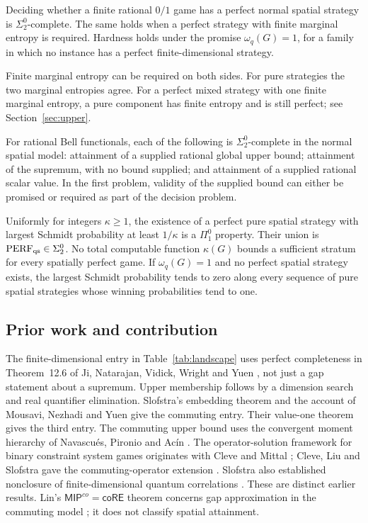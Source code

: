 \begin{theoremA}\label{thm:A}
Deciding whether a finite rational $0/1$ game has a perfect normal spatial strategy is $\Sigma^0_2$-complete. The same holds when a perfect strategy with finite marginal entropy is required. Hardness holds under the promise $\omega_q(G)=1$, for a family in which no instance has a perfect finite-dimensional strategy.
\end{theoremA}

Finite marginal entropy can be required on both sides. For pure strategies the two marginal entropies agree. For a perfect mixed strategy with one finite marginal entropy, a pure component has finite entropy and is still perfect; see Section~\ref{sec:upper}.

\begin{theoremB}\label{thm:B}
For rational Bell functionals, each of the following is $\Sigma^0_2$-complete in the normal spatial model: attainment of a supplied rational global upper bound; attainment of the supremum, with no bound supplied; and attainment of a supplied rational scalar value. In the first problem, validity of the supplied bound can either be promised or required as part of the decision problem.
\end{theoremB}

\begin{theoremC}\label{thm:C}
Uniformly for integers $\kappa\geq1$, the existence of a perfect pure spatial strategy with largest Schmidt probability at least $1/\kappa$ is a $\Pi^0_1$ property. Their union is $\mathrm{PERF}_{\mathrm{qs}}\in\Sigma^0_2$. No total computable function $\kappa(G)$ bounds a sufficient stratum for every spatially perfect game. If $\omega_q(G)=1$ and no perfect spatial strategy exists, the largest Schmidt probability tends to zero along every sequence of pure spatial strategies whose winning probabilities tend to one.
\end{theoremC}

\subsection{Prior work and contribution}
The finite-dimensional entry in Table~\ref{tab:landscape} uses perfect completeness in Theorem~12.6 of Ji, Natarajan, Vidick, Wright and Yuen \cite{MIPRE}, not just a gap statement about a supremum. Upper membership follows by a dimension search and real quantifier elimination. Slofstra's embedding theorem \cite{Slofstra} and the account of Mousavi, Nezhadi and Yuen \cite{MNY} give the commuting entry. Their value-one theorem gives the third entry. The commuting upper bound uses the convergent moment hierarchy of Navascu\'es, Pironio and Ac\'in \cite{NPA}. The operator-solution framework for binary constraint system games originates with Cleve and Mittal \cite{CM}; Cleve, Liu and Slofstra gave the commuting-operator extension \cite{CLS}. Slofstra also established nonclosure of finite-dimensional quantum correlations \cite{SlofstraNonclosed}. These are distinct earlier results. Lin's $\mathsf{MIP}^{co}=\mathsf{coRE}$ theorem concerns gap approximation in the commuting model \cite{Lin}; it does not classify spatial attainment.

